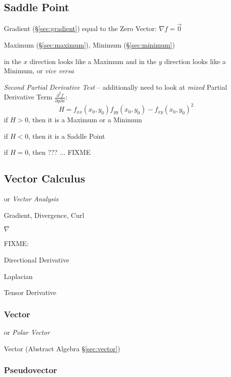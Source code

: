 \subsection{Saddle Point}\label{sec:saddle_point}

Gradient (\S\ref{sec:gradient}) equal to the Zero Vector: $\nabla{f} = \vec{0}$

Maximum (\S\ref{sec:maximum}), Minimum (\S\ref{sec:minimum})

in the $x$ direction looks like a Maximum and in the $y$ direction looks like a
Minimum, or \emph{vice versa}

\emph{Second Partial Derivative Test} -- additionally need to look at
\emph{mixed} Partial Derivative Term
$\frac{\partial^2{f}}{\partial{y}\partial{x}}$:
\[
  H = f_{xx}(x_0,y_0)f_{yy}(x_0,y_0) - f_{xy}(x_0,y_0)^2
\]
if $H > 0$, then it is a Maximum or a Minimum

if $H < 0$, then it is a Saddle Point

if $H = 0$, then ??? ... FIXME



\subsection{Vector Calculus}\label{sec:vector_calclulus}

or \emph{Vector Analysis}

Gradient, Divergence, Curl

$\nabla$

FIXME:

Directional Derivative

Laplacian

Tensor Derivative



\subsubsection{Vector}\label{sec:linear_vector}

or \emph{Polar Vector}

\fist Vector (Abstract Algebra \S\ref{sec:vector})



\subsubsection{Pseudovector}\label{sec:linear_vector}

